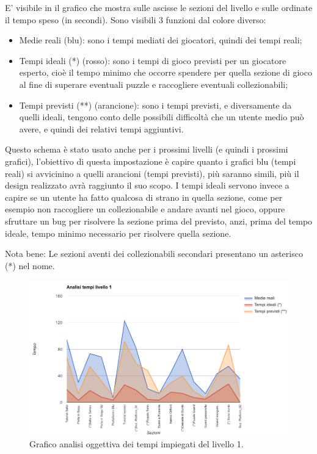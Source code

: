 E' visibile in \myfig{\ref{fig:test_analisi_tempi_01}}  il grafico che mostra sulle ascisse le sezioni del livello e sulle ordinate il tempo speso (in secondi). Sono visibili 3 funzioni dal colore diverso:

\begin{itemize}

\item Medie reali (blu): sono i tempi mediati dei giocatori, quindi dei tempi reali;
\item Tempi ideali (*) (rosso): sono i tempi di gioco previsti per un giocatore esperto, cioè il tempo minimo che occorre spendere per quella sezione di gioco al fine di superare eventuali puzzle e raccogliere eventuali collezionabili;
\item Tempi previsti (**) (arancione): sono i tempi previsti, e diversamente da quelli ideali, tengono conto delle possibili difficoltà che un utente medio può avere, e quindi dei relativi tempi aggiuntivi.

\end {itemize}

Questo schema è stato usato anche per i prossimi livelli (e quindi i prossimi grafici), l'obiettivo di questa impostazione è capire quanto i grafici blu (tempi reali) si avvicinino a quelli arancioni (tempi previsti), più saranno simili, più il design realizzato avrà raggiunto il suo scopo. I tempi ideali servono invece a capire se un utente ha fatto qualcosa di strano in quella sezione, come per esempio non raccogliere un collezionabile e andare avanti nel gioco, oppure sfruttare un bug per risolvere la sezione prima del previsto, anzi, prima del tempo ideale, tempo minimo necessario per risolvere quella sezione.

Nota bene: Le sezioni aventi dei collezionabili secondari presentano un asterisco (*) nel nome. 

\begin{figure}[h]
\centerline{\includegraphics[scale=0.45]{images/risultati/test_01_analisi_tempi_01.png}}
\caption{Grafico analisi oggettiva dei tempi impiegati del livello 1.}
\label{fig:test_analisi_tempi_01}
\end{figure}

